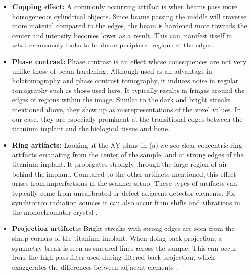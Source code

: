 \begin{itemize}
  \item \textbf{Cupping effect:} A commonly occurring artifact is when beams pass
    more homogeneous cylindrical objects. Since beams passing the middle will
        traverse more material compared to the edges, the beam is hardened more
        towards the center and intensity becomes lower as a result. This can
        manifest itself in what erroneously looks to be dense peripheral
        regions at the edges.

  \item \textbf{Phase contrast:} Phase contrast is an effect whose consequences
    are not very unlike those of beam-hardening.  Although used as an advantage
        in holotomography\citep{holotomography} and phase contrast
        tomography\citep{phasecontrast}, it induces noise in regular tomography
        such as those used here. It typically results in fringes around the
        edges of regions within the image\citep{srnoise}. Similar to the dark
        and bright streaks mentioned above, they show up as misrepresentations
        of the voxel values. In our case, they are especially prominent at the
        transitional edges between the titanium implant and the biological
        tissue and bone.

  \item \textbf{Ring artifacts:} Looking at the XY-plane in
      (a) we see clear concentric ring artifacts emanating
        from the center of the sample, and at strong edges of the titanium
        implant. It propagates strongly through the large region of air behind
        the implant. Compared to the other artifacts mentioned, this effect
        arises from imperfections in the scanner setup. These types of
        artifacts can typically come from uncalibrated or defect-adjacent
        detector elements. For synchrotron radiation sources it can also occur
        from shifts and vibrations in the monochromator crystal
        \citep{ringartefacts}.

  \item \textbf{Projection artifacts:} Bright streaks with strong edges are
      seen from the sharp corners of the titanium implant. When doing back
      projection, a symmetry break is seen as smeared lines across the sample.
      This can occur from the high pass filter used during filtered back
      projection, which exaggerates the differences between adjacent elements
      \citep{ctnoise}.


\end{itemize}
